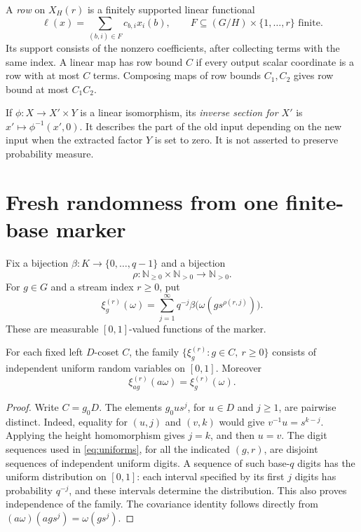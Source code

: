 \documentclass[11pt,a4paper]{article}
\numberwithin{equation}{section}
\newcommand{\NN}{\mathbb N}
\begin{document}
\begin{definition}\label{def:rows}
A \emph{row} on $X_H(r)$ is a finitely supported linear functional
\[
 \ell(x)=\sum_{(b,i)\in F}c_{b,i}x_i(b),
 \qquad F\subseteq (G/H)\times\{1,\ldots,r\}\text{ finite}.
\]
Its support consists of the nonzero coefficients, after collecting terms
with the same index. A linear map has row bound $C$ if every output
scalar coordinate is a row with at most $C$ terms. Composing maps of
row bounds $C_1,C_2$ gives row bound at most $C_1C_2$.

If $\phi:X\to X'\times Y$ is a linear isomorphism, its \emph{inverse
section for $X'$} is $x'\mapsto\phi^{-1}(x',0)$. It describes the part
of the old input depending on the new input when the extracted factor
$Y$ is set to zero. It is not asserted to preserve probability measure.
\end{definition}

\section{Fresh randomness from one finite-base marker}\label{sec:marker}

Fix a bijection $\beta:K\to\{0,\ldots,q-1\}$ and a bijection
\[
 \rho:\NN_{\geq0}\times\NN_{>0}\longrightarrow\NN_{>0}.
\]
For $g\in G$ and a stream index $r\geq0$, put
\begin{equation}\label{eq:uniforms}
 \xi_g^{(r)}(\omega)
   =\sum_{j=1}^{\infty}q^{-j}
          \beta\bigl(\omega(gs^{\rho(r,j)})\bigr).
\end{equation}
These are measurable $[0,1]$-valued functions of the marker.

\begin{lemma}\label{lem:marker}
For each fixed left $D$-coset $C$, the family
$\{\xi_g^{(r)}:g\in C,\ r\geq0\}$ consists of independent uniform
random variables on $[0,1]$. Moreover
\[
 \xi_{ag}^{(r)}(a\omega)=\xi_g^{(r)}(\omega).
\]
\end{lemma}
\begin{proof}
Write $C=g_0D$. The elements $g_0us^j$, for $u\in D$ and $j\geq1$,
are pairwise distinct. Indeed, equality for $(u,j)$ and $(v,k)$ would
give $v^{-1}u=s^{k-j}$. Applying the height homomorphism gives
$j=k$, and then $u=v$.
The digit sequences used in \eqref{eq:uniforms}, for all the indicated
$(g,r)$, are disjoint sequences of independent uniform digits. A sequence
of such base-$q$ digits has the uniform distribution on $[0,1]$: each
interval specified by its first $j$ digits has probability $q^{-j}$,
and these intervals determine the distribution. This also proves
independence of the family. The covariance identity follows directly
from $(a\omega)(ag s^j)=\omega(gs^j)$.
\end{proof}
\end{document}
